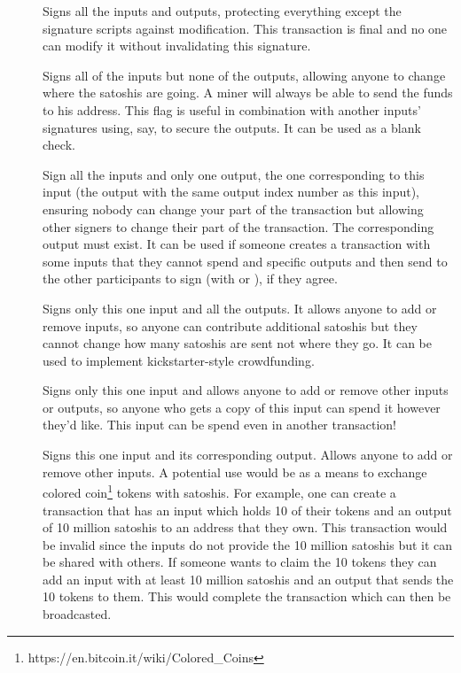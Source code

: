 \begin{description}
\item[] Signs all the inputs and outputs, protecting everything except the signature scripts against modification. This transaction is final and no one can modify it without invalidating this signature.
\item[] Signs all of the inputs but none of the outputs, allowing anyone to change where the satoshis are going. A miner will always be able to send the funds to his address. This flag is useful in combination with another inputs’ signatures using, say,  to secure the outputs. It can be used as a blank check.
\item[] Sign all the inputs and only one output, the one corresponding to this input (the output with the same output index number as this input), ensuring nobody can change your part of the transaction but allowing other signers to change their part of the transaction. The corresponding output must exist. It can be used if someone creates a transaction with some inputs that they cannot spend and specific outputs and then send to the other participants to sign (with  or ), if they agree.
\item[] Signs only this one input and all the outputs. It allows anyone to add or remove inputs, so anyone can contribute additional satoshis but they cannot change how many satoshis are sent not where they go. It can be used to implement kickstarter-style crowdfunding.
\item[] Signs only this one input and allows anyone to add or remove other inputs or outputs, so anyone who gets a copy of this input can spend it however they’d like. This input can be spend even in another transaction!
\item[] Signs this one input and its corresponding output. Allows anyone to add or remove other inputs. A potential use would be as a means to exchange colored coin\footnote{https://en.bitcoin.it/wiki/Colored\_Coins} tokens with satoshis. For example, one can create a transaction that has an input which holds 10 of their tokens and an output of 10 million satoshis to an address that they own. This transaction would be invalid since the inputs do not provide the 10 million satoshis but it can be shared with others. If someone wants to claim the 10 tokens they can add an input with at least 10 million satoshis and an output that sends the 10 tokens to them. This would complete the transaction which can then be broadcasted.
\end{description}

